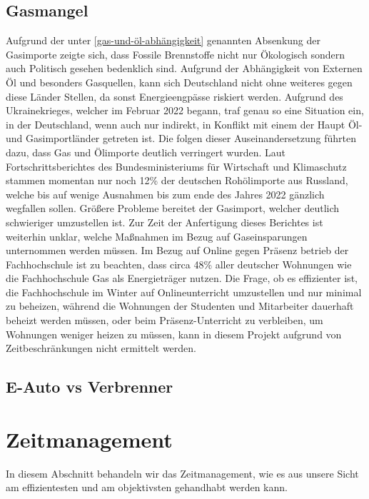 \documentclass[a4paper,12pt]{scrartcl}
\begin{document}
\subsection{Gasmangel}
Aufgrund der unter \autoref{gas-und-öl-abhängigkeit} genannten Absenkung der Gasimporte zeigte sich, dass Fossile Brennstoffe nicht nur Ökologisch sondern auch Politisch gesehen bedenklich sind. Aufgrund der Abhängigkeit von Externen Öl und besonders Gasquellen, kann sich Deutschland nicht ohne weiteres gegen diese Länder Stellen, da sonst Energieengpässe riskiert werden. Aufgrund des Ukrainekrieges, welcher im Februar 2022 begann, traf genau so eine Situation ein, in der Deutschland, wenn auch nur indirekt, in Konflikt mit einem der Haupt Öl- und Gasimportländer getreten ist. Die folgen dieser Auseinandersetzung führten dazu, dass Gas und Ölimporte deutlich verringert wurden.
Laut Fortschrittsberichtes des Bundesministeriums für Wirtschaft und Klimaschutz stammen momentan nur noch 12\% der deutschen Rohölimporte aus Russland, welche bis auf wenige Ausnahmen bis zum ende des Jahres 2022 gänzlich wegfallen sollen. Größere Probleme bereitet der Gasimport, welcher deutlich schwieriger umzustellen ist.
Zur Zeit der Anfertigung dieses Berichtes ist weiterhin unklar, welche Maßnahmen im Bezug auf Gaseinsparungen unternommen werden müssen. Im Bezug auf Online gegen Präsenz betrieb der Fachhochschule ist zu beachten, dass circa 48\% aller deutscher Wohnungen wie die Fachhochschule Gas als Energieträger nutzen. Die Frage, ob es effizienter ist, die Fachhochschule im Winter auf Onlineunterricht umzustellen und nur minimal zu beheizen, während die Wohnungen der Studenten und Mitarbeiter dauerhaft beheizt werden müssen, oder beim Präsenz-Unterricht zu verbleiben, um Wohnungen weniger heizen zu müssen, kann in diesem Projekt aufgrund von Zeitbeschränkungen nicht ermittelt werden.

\subsection{E-Auto vs Verbrenner}

\section{Zeitmanagement}
In diesem Abschnitt behandeln wir das Zeitmanagement, wie es aus unsere Sicht am effizientesten und am objektivsten gehandhabt werden kann.
\end{document}
